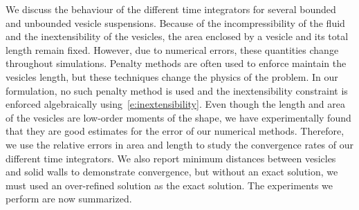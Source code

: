 We discuss the behaviour of the different time integrators for several
bounded and unbounded vesicle suspensions.  Because of the
incompressibility of the fluid and the inextensibility of the vesicles,
the area enclosed by a vesicle and its total length remain fixed.
However, due to numerical errors, these quantities change throughout
simulations.  Penalty methods are often used to enforce maintain the
vesicles length, but these techniques change the physics of the problem.
In our formulation, no such penalty method is used and the
inextensibility constraint is enforced algebraically
using~\eqref{e:inextensibility}.  Even though the length and area of the
vesicles are low-order moments of the shape, we have experimentally
found that they are good estimates for the error of our numerical
methods.  Therefore, we use the relative errors in area and length to
study the convergence rates of our different time integrators.  We also
report minimum distances between vesicles and solid walls to demonstrate
convergence, but without an exact solution, we must used an over-refined
solution as the exact solution.  The experiments we perform are now
summarized.


